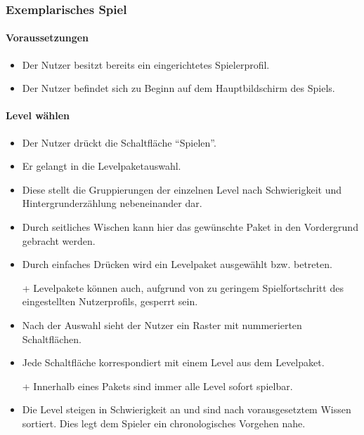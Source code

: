 \subsubsection{Exemplarisches Spiel}
\paragraph{Voraussetzungen}\mbox{}\newline
\begin{itemize}
\item Der Nutzer besitzt bereits ein eingerichtetes Spielerprofil.
\item Der Nutzer befindet sich zu Beginn auf dem Hauptbildschirm des Spiels.
\end{itemize}

\paragraph{Level wählen}\mbox{}\newline
\begin{itemize}
\item Der Nutzer drückt die Schaltfläche ``Spielen''.
\item Er gelangt in die Levelpaketauswahl.
\item Diese stellt die Gruppierungen der einzelnen Level nach Schwierigkeit und 
Hintergrunderzählung nebeneinander dar. 
\item Durch seitliches Wischen kann hier das gewünschte Paket in den Vordergrund gebracht werden.
\item Durch einfaches Drücken wird ein Levelpaket ausgewählt bzw. betreten.
\item[+] Levelpakete können auch, aufgrund von zu geringem Spielfortschritt des 
eingestellten Nutzerprofils, gesperrt sein.
\item Nach der Auswahl sieht der Nutzer ein Raster mit nummerierten Schaltflächen.
\item Jede Schaltfläche korrespondiert mit einem Level aus dem Levelpaket.
\item[+] Innerhalb eines Pakets sind immer alle Level sofort spielbar.
\item Die Level steigen in Schwierigkeit an und sind nach vorausgesetztem Wissen sortiert. Dies legt
dem Spieler ein chronologisches Vorgehen nahe.
\end{itemize}

